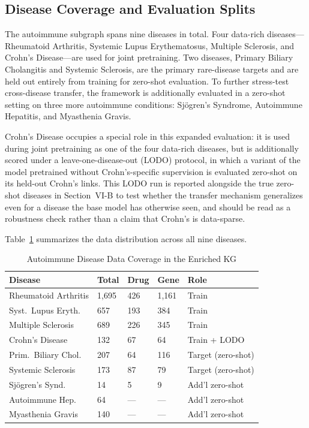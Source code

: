 \documentclass[conference]{IEEEtran}
\begin{document}
\subsection{Disease Coverage and Evaluation Splits}

The autoimmune subgraph spans nine diseases in total. Four data-rich diseases---Rheumatoid Arthritis, Systemic Lupus Erythematosus, Multiple Sclerosis, and Crohn's Disease---are used for joint pretraining. Two diseases, Primary Biliary Cholangitis and Systemic Sclerosis, are the primary rare-disease targets and are held out entirely from training for zero-shot evaluation. To further stress-test cross-disease transfer, the framework is additionally evaluated in a zero-shot setting on three more autoimmune conditions: Sj\"{o}gren's Syndrome, Autoimmune Hepatitis, and Myasthenia Gravis.

Crohn's Disease occupies a special role in this expanded evaluation: it is used during joint pretraining as one of the four data-rich diseases, but is additionally scored under a leave-one-disease-out (LODO) protocol, in which a variant of the model pretrained without Crohn's-specific supervision is evaluated zero-shot on its held-out Crohn's links. This LODO run is reported alongside the true zero-shot diseases in Section~VI-B to test whether the transfer mechanism generalizes even for a disease the base model has otherwise seen, and should be read as a robustness check rather than a claim that Crohn's is data-sparse.

Table~\ref{tab:disease_coverage} summarizes the data distribution across all nine diseases.

\begin{table}[!t]
\caption{Autoimmune Disease Data Coverage in the Enriched KG}
\label{tab:disease_coverage}
\centering
\footnotesize
\renewcommand{\arraystretch}{1.4}
\begin{tabular}{p{2.3cm}p{0.7cm}p{0.7cm}p{0.7cm}p{1.8cm}}
\toprule
\textbf{Disease} & \textbf{Total} & \textbf{Drug} & \textbf{Gene} & \textbf{Role} \\
\midrule
Rheumatoid Arthritis & 1,695 & 426 & 1,161 & Train \\
Syst.\ Lupus Eryth. & 657 & 193 & 384 & Train \\
Multiple Sclerosis & 689 & 226 & 345 & Train \\
Crohn's Disease & 132 & 67 & 64 & Train + LODO \\
\midrule
Prim.\ Biliary Chol. & 207 & 64 & 116 & Target (zero-shot) \\
Systemic Sclerosis & 173 & 87 & 79 & Target (zero-shot) \\
Sj\"{o}gren's Synd. & 14 & 5 & 9 & Add'l zero-shot \\
Autoimmune Hep. & 64 & --- & --- & Add'l zero-shot \\
Myasthenia Gravis & 140 & --- & --- & Add'l zero-shot \\
\bottomrule
\end{tabular}
\end{table}
\end{document}
